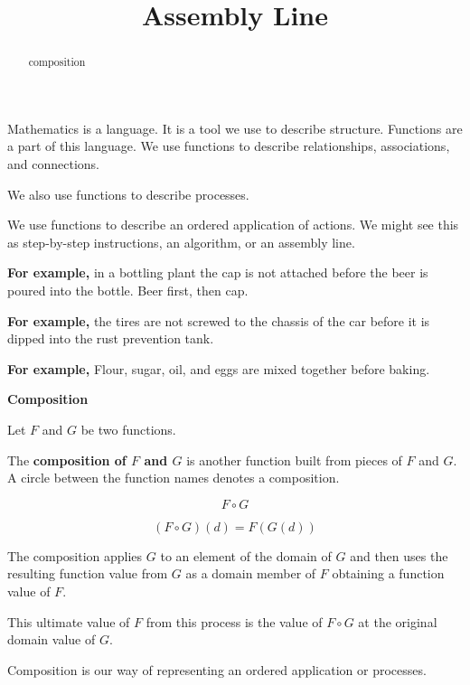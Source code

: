 \documentclass{ximera}
\title{Assembly Line}
\begin{document}
\begin{abstract}
composition
\end{abstract}
\maketitle





Mathematics is a language. It is a tool we use to describe structure. Functions are a part of this language. We use functions to describe relationships, associations, and connections.

We also use functions to describe processes.

We use functions to describe an ordered application of actions. We might see this as step-by-step instructions, an algorithm, or an assembly line.



\textbf{For example,} in a bottling plant the cap is not attached before the beer is poured into the bottle. Beer first, then cap.


\textbf{For example,} the tires are not screwed to the chassis of the car before it is dipped into the rust prevention tank.


\textbf{For example,} Flour, sugar, oil, and eggs are mixed together before baking.





\begin{definition} \textbf{\textcolor{green!50!black}{Composition}}


Let $F$ and $G$ be two functions.

The \textbf{composition of $F$ and $G$} is another function built from pieces of $F$ and $G$. A circle between the function names denotes a composition.

\[
F \circ G
\]


\[
(F \circ G)(d) = F(G(d))
\]


The composition applies $G$ to an element of the domain of $G$ and then uses the resulting function value from $G$ as a domain member of $F$ obtaining a function value of $F$.

This ultimate value of $F$ from this process is the value of $F \circ G$ at the original domain value of $G$.

\end{definition}



Composition is our way of representing an ordered application or processes.
\end{document}
